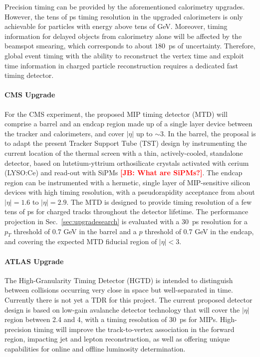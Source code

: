 Precision timing can be provided by the aforementioned calorimetry upgrades. However, the tens of ps timing resolution in the upgraded calorimeters is only achievable for particles with energy above tens of GeV. Moreover, timing information for delayed objects from calorimetry alone will be affected by the beamspot smearing, which corresponds to about $180$~ps of uncertainty. Therefore, global event timing with the ability to reconstruct the vertex time and exploit time information in charged particle reconstruction requires a dedicated fast timing detector.

\paragraph{CMS Upgrade} 

For the CMS experiment, the proposed MIP timing detector (MTD) will comprise a barrel and an endcap region made up of a single layer device between the tracker and calorimeters, and cover $|\eta|$ up to $\sim3$. In the barrel, the proposal is to adapt the present Tracker Support Tube (TST) design by instrumenting the current location of the thermal screen with a thin, actively-cooled, standalone detector, based on lutetium-yttrium orthosilicate crystals activated with cerium (LYSO:Ce) and read-out with SiPMs {\bf \textcolor{red}{[JB: What are SiPMs?]}}. The endcap region can be instrumented with a hermetic, single layer of MIP-sensitive silicon devices with high timing resolution, with a pseudorapidity acceptance from about $|\eta|=1.6$ to $|\eta|=2.9$. The MTD is designed to provide timing resolution of a few tens of ps for charged tracks throughout the detector lifetime. The performance projection in Sec.~\ref{sec:upgradesearch} is evaluated with a 30~ps resolution for a $p_T$ threshold of 0.7 GeV in the barrel and a $p$ threshold of 0.7 GeV in the endcap, and covering the expected MTD fiducial region of $|\eta| < 3$.

\paragraph{ATLAS Upgrade}

The High-Granularity Timing Detector (HGTD) is intended to distinguish between collisions occurring very close in space but well-separated in time. Currently there is not yet a TDR for this project. The current proposed detector design is based on low-gain avalanche detector technology that will cover the $|\eta|$ region between 2.4 and 4,
with a timing resolution of 30~ps for MIPs. High-precision timing will improve the track-to-vertex association in the forward region, impacting jet and lepton reconstruction, as well as offering unique capabilities for online and offline luminosity determination.

